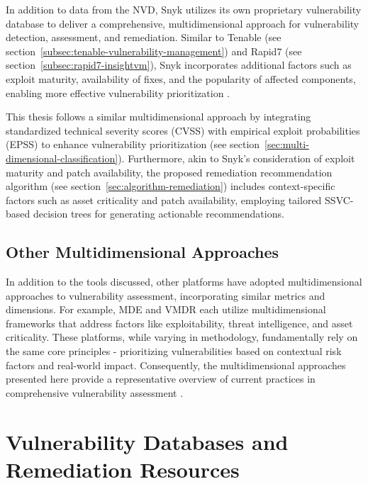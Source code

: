 In addition to data from the \ac{NVD}, Snyk utilizes its own proprietary vulnerability database to deliver a comprehensive, multidimensional approach for vulnerability detection, assessment, and remediation. Similar to Tenable (see section~\ref{subsec:tenable-vulnerability-management}) and Rapid7 (see section~\ref{subsec:rapid7-insightvm}), Snyk incorporates additional factors such as exploit maturity, availability of fixes, and the popularity of affected components, enabling more effective vulnerability prioritization \autocite{snyk_limited_vier_2024}.

This thesis follows a similar multidimensional approach by integrating standardized technical severity scores (\ac{CVSS}) with empirical exploit probabilities (\ac{EPSS}) to enhance vulnerability prioritization (see section~\ref{sec:multi-dimensional-classification}). Furthermore, akin to Snyk’s consideration of exploit maturity and patch availability, the proposed remediation recommendation algorithm (see section~\ref{sec:algorithm-remediation}) includes context-specific factors such as asset criticality and patch availability, employing tailored \ac{SSVC}-based decision trees for generating actionable recommendations.

\subsection{Other Multidimensional Approaches}
\label{subsec:other-multidimensional-approaches}

In addition to the tools discussed, other platforms have adopted multidimensional approaches to vulnerability assessment, incorporating similar metrics and dimensions. For example, \ac{MDE} and \ac{VMDR} each utilize multidimensional frameworks that address factors like exploitability, threat intelligence, and asset criticality. These platforms, while varying in methodology, fundamentally rely on the same core principles - prioritizing vulnerabilities based on contextual risk factors and real-world impact. Consequently, the multidimensional approaches presented here provide a representative overview of current practices in comprehensive vulnerability assessment \autocite{microsoft_corporation_compare_2024, qualys_qualys_2022}.

\section{Vulnerability Databases and Remediation Resources}
\label{sec:vulnerability-databases-resources}

